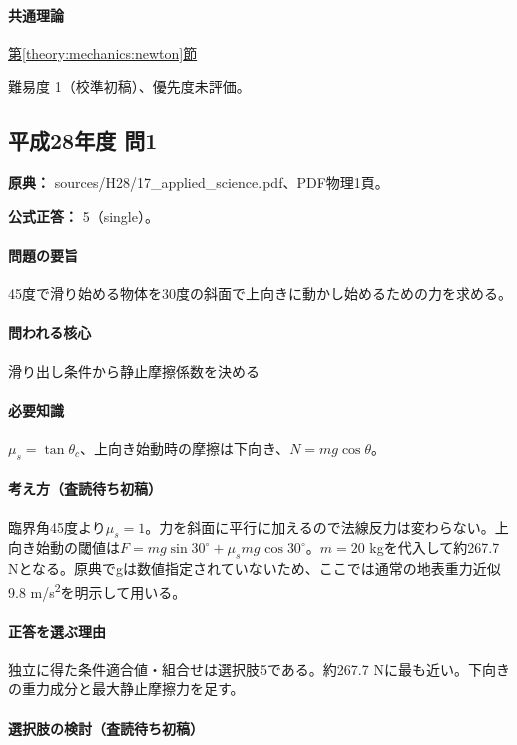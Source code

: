 \paragraph{共通理論} \hyperref[theory:mechanics:newton]{第\ref*{theory:mechanics:newton}節}

\par 難易度 1（校準初稿）、優先度未評価。

\subsection{平成28年度 問1}
\label{q:h28-reg-applied-01}

\noindent\textbf{原典：} sources/H28/17\_applied\_science.pdf、PDF物理1頁。

\textbf{公式正答：} 5（single）。

\paragraph{問題の要旨} 45度で滑り始める物体を30度の斜面で上向きに動かし始めるための力を求める。

\paragraph{問われる核心} 滑り出し条件から静止摩擦係数を決める

\paragraph{必要知識} \(\mu_s=\tan\theta_c\)、上向き始動時の摩擦は下向き、\(N=mg\cos\theta\)。

\paragraph{考え方（査読待ち初稿）} 臨界角45度より\(\mu_s=1\)。力を斜面に平行に加えるので法線反力は変わらない。上向き始動の閾値は\(F=mg\sin30^\circ+\mu_smg\cos30^\circ\)。\(m=20\) kgを代入して約267.7 Nとなる。原典でgは数値指定されていないため、ここでは通常の地表重力近似9.8 m/s\textsuperscript{2}を明示して用いる。

\paragraph{正答を選ぶ理由} 独立に得た条件適合値・組合せは選択肢5である。約267.7 Nに最も近い。下向きの重力成分と最大静止摩擦力を足す。

\paragraph{選択肢の検討（査読待ち初稿）}

